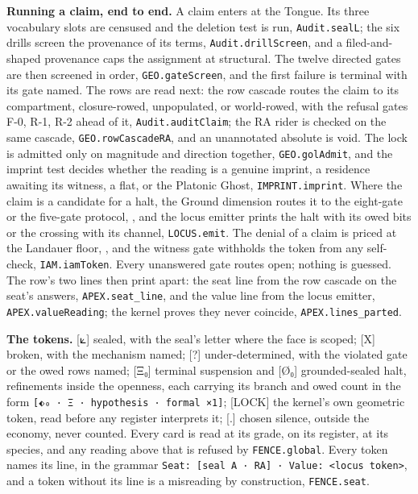 \documentclass[10pt,twocolumn]{article}
\begin{document}
\textbf{Running a claim, end to end.} A claim enters at the Tongue. Its
three vocabulary slots are censused and the deletion test is run,
\texttt{Audit.sealL}; the six drills screen the provenance of its terms,
\texttt{Audit.drillScreen}, and a filed-and-shaped provenance caps the
assignment at structural. The twelve directed gates are then screened in
order, \texttt{GEO.gateScreen}, and the first failure is terminal with
its gate named. The rows are read next: the row cascade routes the claim
to its compartment, closure-rowed, unpopulated, or world-rowed, with the
refusal gates F-0, R-1, R-2 ahead of it, \texttt{Audit.auditClaim}; the
RA rider is checked on the same cascade, \texttt{GEO.rowCascadeRA}, and
an unannotated absolute is void. The lock is admitted only on magnitude
and direction together, \texttt{GEO.golAdmit}, and the imprint test
decides whether the reading is a genuine imprint, a residence awaiting
its witness, a flat, or the Platonic Ghost, \texttt{IMPRINT.imprint}.
Where the claim is a candidate for a halt, the Ground dimension routes
it to the eight-gate or the five-gate protocol,
\texttt{}, and the locus emitter prints
the halt with its owed bits or the crossing with its channel,
\texttt{LOCUS.emit}. The denial of a claim is priced at the Landauer
floor, \texttt{}, and the witness gate
withholds the token from any self-check, \texttt{IAM.iamToken}. Every
unanswered gate routes open; nothing is guessed. The row's two lines
then print apart: the seat line from the row cascade on the seat's
answers, \texttt{APEX.seat\_line}, and the value line from the locus
emitter, \texttt{APEX.valueReading}; the kernel proves they never
coincide, \texttt{APEX.lines\_parted}.

\textbf{The tokens.} {[}⟀{]} sealed, with the seal's letter where the
face is scoped; {[}X{]} broken, with the mechanism named; {[}?{]}
under-determined, with the violated gate or the owed rows named;
{[}Ξ₀{]} terminal suspension and {[}Ø₀{]} grounded-sealed halt,
refinements inside the openness, each carrying its branch and owed count
in the form \texttt{{[}⬖₀\ ·\ Ξ\ ·\ hypothesis\ ·\ formal\ ×1{]}};
{[}LOCK{]} the kernel's own geometric token, read before any register
interprets it; {[}.{]} chosen silence, outside the economy, never
counted. Every card is read at its grade, on its register, at its
species, and any reading above that is refused by \texttt{FENCE.global}.
Every token names its line, in the grammar
\texttt{Seat:\ {[}seal\ A\ ·\ RA{]}\ ·\ Value:\ \textless{}locus\ token\textgreater{}},
and a token without its line is a misreading by construction,
\texttt{FENCE.seat}.
\end{document}
